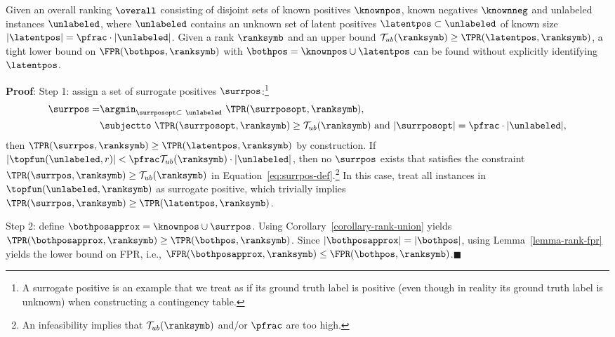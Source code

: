 \begin{theorem} \label{main-theorem}
Given an overall ranking $\overall$ consisting of disjoint sets of known positives $\knownpos$, known negatives $\knownneg$ and unlabeled instances $\unlabeled$, where $\unlabeled$ contains an unknown set of latent positives $\latentpos \subset \unlabeled$ of known size $|\latentpos| = \pfrac \cdot|\unlabeled|$. Given a rank $\ranksymb$ and an upper bound $\mathcal{T}_{ub}(\ranksymb) \geq \TPR(\latentpos, \ranksymb)$, a tight lower bound on $\FPR(\bothpos, \ranksymb)$ with $\bothpos = \knownpos \cup \latentpos$ can be found without explicitly identifying $\latentpos$.


\textbf{Proof}: Step 1: assign a set of surrogate positives $\surrpos$:\footnote{A surrogate positive is an example that we treat as if its ground truth label is positive (even though in reality its ground truth label is unknown) when constructing a contingency table.}
\begin{align}
\surrpos = &\argmin_{\surrposopt\subset\ \unlabeled}\ \TPR(\surrposopt, \ranksymb), \label{eq:surrpos-def}  \\ 
&\subjectto\ \TPR(\surrposopt,\ranksymb) \geq \mathcal{T}_{ub}(\ranksymb) \text{ and } |\surrposopt|=\pfrac\cdot|\unlabeled|, \nonumber
\end{align}
then $\TPR(\surrpos,\ranksymb) \geq \TPR(\latentpos,\ranksymb)$ by construction. If $|\topfun(\unlabeled, r)| < \pfrac\mathcal{T}_{ub}(\ranksymb)\cdot |\unlabeled|$, then no $\surrpos$ exists that satisfies the constraint $\TPR(\surrpos, \ranksymb) \geq \mathcal{T}_{ub}(\ranksymb)$ in Equation~\eqref{eq:surrpos-def}.\footnote{An infeasibility implies that $\mathcal{T}_{ub}(\ranksymb)$ and/or $\pfrac$ are too high.} In this case, treat all instances in $\topfun(\unlabeled, \ranksymb)$ as surrogate positive, which trivially implies $\TPR(\surrpos, \ranksymb) \geq \TPR(\latentpos, \ranksymb)$.

Step 2: define $\bothposapprox = \knownpos \cup \surrpos$. Using Corollary~\ref{corollary-rank-union} yields $\TPR(\bothposapprox, \ranksymb) \geq \TPR(\bothpos, \ranksymb)$. Since $|\bothposapprox|=|\bothpos|$, using Lemma~\ref*{lemma-rank-fpr} yields the lower bound on FPR, i.e., $\FPR(\bothposapprox, \ranksymb) \leq \FPR(\bothpos, \ranksymb)$.\hfill$\blacksquare$
\end{theorem}

